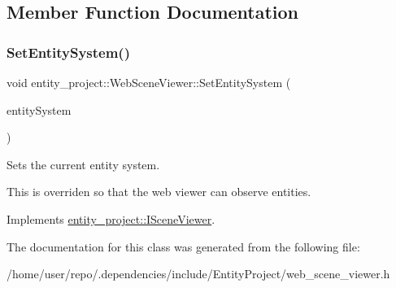 \subsection{Member Function Documentation}
\mbox{\label{classentity__project_1_1WebSceneViewer_af8194e84e65c3688e934f71b1736b8fc}} 
\subsubsection{\texorpdfstring{Set\+Entity\+System()}{SetEntitySystem()}}
{\footnotesize\ttfamily void entity\+\_\+project\+::\+Web\+Scene\+Viewer\+::\+Set\+Entity\+System (\begin{DoxyParamCaption}\item[{\hyperlink{classentity__project_1_1IEntitySystem}{I\+Entity\+System} $\ast$}]{entity\+System }\end{DoxyParamCaption})\hspace{0.3cm}{\ttfamily [virtual]}}



Sets the current entity system. 

This is overriden so that the web viewer can observe entities. 

Implements \hyperlink{classentity__project_1_1ISceneViewer_ab6c9ee1c8c551dd463e8ff1788b3d407}{entity\+\_\+project\+::\+I\+Scene\+Viewer}.



The documentation for this class was generated from the following file\+:\begin{DoxyCompactItemize}
\item 
/home/user/repo/.\+dependencies/include/\+Entity\+Project/web\+\_\+scene\+\_\+viewer.\+h\end{DoxyCompactItemize}
